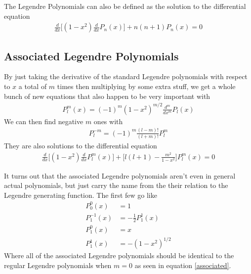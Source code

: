 
The Legendre Polynomials can also be defined as the solution to the differential equation
\begin{align}\label{legendrediffeq}
\frac{d}{dx}\Big[(1-x^2)\frac{d}{dx} P_n(x)\Big] + n(n+1)P_n(x) = 0
\end{align}






\subsection{Associated Legendre Polynomials}

By just taking the derivative of the standard Legendre polynomials with respect to $x$ a total of $m$ times then multiplying by some extra stuff, we get a whole bunch of new equations that also happen to be very important with
\begin{align}\label{associated}
P^m_l(x) = (-1)^m(1-x^2)^{m/2}\frac{d^m}{dx^m}P_l(x)
\end{align}
We can then find negative $m$ ones with
\begin{align}
P^{-m}_l = (-1)^m\frac{(l-m)!}{(l+m)!}P_l^m
\end{align}
They are also solutions to the differential equation
\begin{align}\label{associatedlegendre}
\frac{d}{dx}\Big[(1-x^2)\frac{d}{dx}P_l^m(x)\Big] + \Big[l(l+1) - \frac{m^2}{1-x^2}\Big]P_l^m(x) = 0
\end{align}

It turns out that the associated Legendre polynomials aren't even in general actual polynomials, but just carry the name from the their relation to the Legendre generating function. The first few go like
\begin{align}
P_0^0(x) &= 1\\
P_1^{-1}(x) &= -\frac{1}{2}P_1^1(x)\\
P_1^0(x) &= x\\ 
P_1^1(x) &= -(1-x^2)^{1/2}
\end{align}
Where all of the associated Legendre polynomials should be identical to the regular Legendre polynomials when $m = 0$ as seen in equation \ref{associated}.



